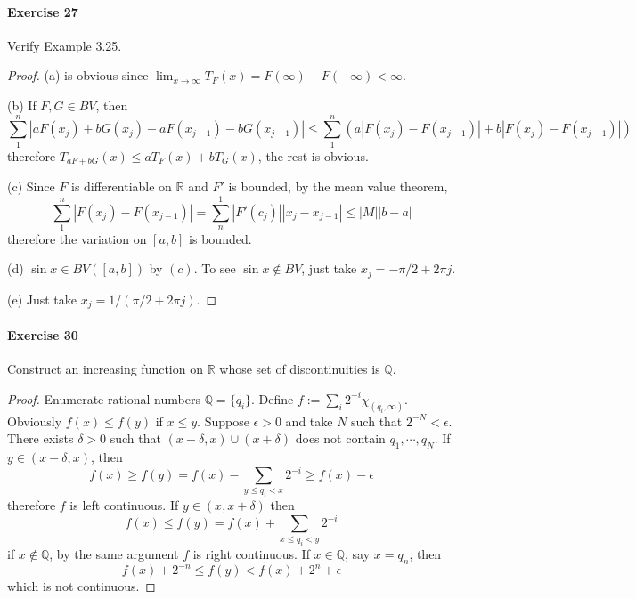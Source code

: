 \paragraph*{Exercise 27}
Verify Example 3.25.
\begin{proof}
    (a) is obvious since $\lim_{x\to\infty}T_F(x)=F(\infty)-F(-\infty)<\infty$. 
    \par (b) If $F,G\in BV$, then
    $$
    \sum_1^n|aF(x_j)+bG(x_j)-aF(x_{j-1})-bG(x_{j-1})|\le\sum_1^n(a|F(x_j)-F(x_{j-1})|+b|F(x_j)-F(x_{j-1})|)
    $$
    therefore $T_{aF+bG}(x)\le aT_F(x)+bT_G(x)$, the rest is obvious.
    \par (c) Since $F$ is differentiable on $\mathbb{R}$ and $F'$ is bounded, by the mean value theorem,
    $$
    \sum^n_1|F(x_j)-F(x_{j-1})|=\sum^1_n |F'(c_j)||x_j-x_{j-1}|\le|M||b-a|
    $$
    therefore the variation on $[a,b]$ is bounded.
    \par (d) $\sin x\in BV([a,b])$ by $(c)$. To see $\sin x\not\in BV$, just take $x_j=-\pi/2+2\pi j$.
    \par (e) Just take $x_j=1/(\pi/2+2\pi j)$.
\end{proof}
\paragraph*{Exercise 30}
Construct an increasing function on $\mathbb{R}$ whose set of discontinuities is $\mathbb{Q}$.
\begin{proof}
    Enumerate rational numbers $\mathbb{Q}=\{q_i\}$. Define $f:=\sum_i2^{-i}\chi_{(q_i,\infty)}$. Obviously $f(x)\le f(y)$ if $x\le y$. Suppose $\epsilon>0$ and take $N$ such that $2^{-N}<\epsilon$. There exists $\delta>0$ such that $(x-\delta,x)\cup(x+\delta)$ does not contain $q_1,\cdots,q_N$. If $y\in(x-\delta,x)$, then
    $$
    f(x)\ge f(y)=f(x)-\sum_{y\le q_i<x}2^{-i}\ge f(x)-\epsilon
    $$
    therefore $f$ is left continuous. If $y\in(x,x+\delta)$ then
    $$
    f(x)\le f(y)=f(x)+\sum_{x\le q_i<y}2^{-i}
    $$
    if $x\not\in\mathbb{Q}$, by the same argument $f$ is right continuous. If $x\in\mathbb{Q}$, say $x=q_n$, then
    $$
    f(x)+2^{-n}\le f(y)<f(x)+2^{n}+\epsilon
    $$
    which is not continuous.
\end{proof}